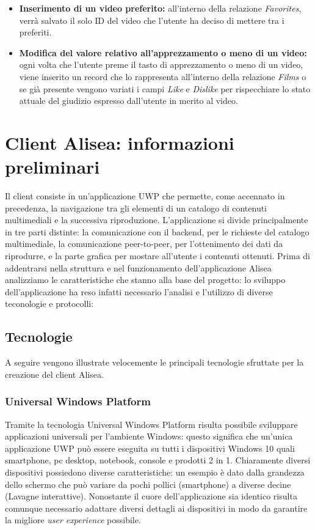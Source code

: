 \documentclass[a4]{book}
\begin{document}
\begin{itemize}
	\item \textbf{Inserimento di un video preferito:} all'interno della relazione \textit{Favorites}, verrà salvato il solo ID del video che l'utente ha deciso di mettere tra i preferiti.
	\item \textbf{Modifica del valore relativo all'apprezzamento o meno di un video:} ogni volta che l'utente preme il tasto di apprezzamento o meno di un video, viene inserito un record che lo rappresenta all'interno della relazione \textit{Films} o se già presente vengono variati i campi \textit{Like} e \textit{Dislike} per rispecchiare lo stato attuale del giudizio espresso dall'utente in merito al video.
\end{itemize}

\chapter{Client Alisea: informazioni preliminari}
Il client consiste in un'applicazione UWP che permette, come accennato in precedenza, la navigazione tra gli elementi di un catalogo di contenuti multimediali e la successiva riproduzione. L'applicazione si divide principalmente in tre parti distinte: la comunicazione con il backend, per le richieste del catalogo multimediale, la comunicazione peer-to-peer, per l'ottenimento dei dati da riprodurre, e la parte grafica per mostare all'utente i contenuti ottenuti.\newline
Prima di addentrarsi nella struttura e nel funzionamento dell'applicazione Alisea analizziamo le caratteristiche che stanno alla base del progetto: lo sviluppo dell'applicazione ha reso infatti necessario l'analisi e l'utilizzo di diverse teconologie e protocolli:

\section{Tecnologie}
A seguire vengono illustrate velocemente le principali tecnologie sfruttate per la creazione del client Alisea.
\subsection{Universal Windows Platform}
Tramite la tecnologia Universal Windows Platform risulta possibile sviluppare applicazioni universali per l'ambiente Windows: questo significa che un'unica applicazione UWP può essere eseguita su tutti i dispositivi Windows 10 quali smartphone, pc desktop, notebook, console e prodotti 2 in 1.\newline
Chiaramente diversi dispositivi possiedono diverse caratteristiche: un esempio è dato dalla grandezza dello schermo che può variare da pochi pollici (smartphone) a diverse decine (Lavagne interattive). Nonostante il cuore dell'applicazione sia identico risulta comunque necessario adattare diversi dettagli ai dispositivi in modo da garantire la migliore \textit{user experience} possibile.\newline
\end{document}
